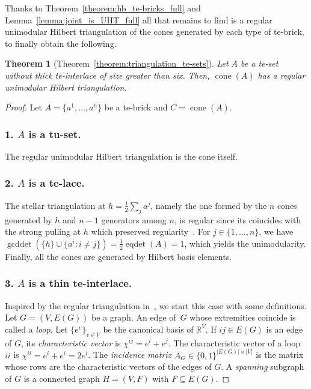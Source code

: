 \documentclass[11pt,a4paper]{amsart}
\theoremstyle{plain}
\newtheorem{theorem}{Theorem}[section]%
\theoremstyle{definition}
\newcommand{\R}{\mathbb{R}}
\DeclareMathOperator{\cone}{cone}
\DeclareMathOperator{\eqdet}{eqdet}
\DeclareMathOperator{\gcddet}{gcddet}
\begin{document}
Thanks to Theorem~\ref{theorem:hb_te-bricks_full} and Lemma~\ref{lemma:joint_is_UHT_full} all that remains to find is a regular unimodular Hilbert triangulation of the cones generated by each type of te-brick, to finally obtain the following.
\begin{theorem}[Theorem~\ref{theorem:triangulation_te-sets}]\label{theorem:triangulation_te-sets_l}
Let $A$ be a te-set without thick te-interlace of size greater than six.
Then, $\cone (A)$ has a regular unimodular Hilbert triangulation.
\end{theorem}
\begin{proof}
Let $A=\{a^1,\dots,a^n\}$ be a te-brick and $C=\cone(A)$.
\subsubsection*{1. $A$ is a tu-set.}
The regular unimodular Hilbert triangulation is the cone itself.

\subsubsection*{2. $A$ is a te-lace.}
The stellar triangulation at $h=\frac{1}{2}\sum_j a^j$, namely the one formed by the $n$ cones generated by $h$ and $n-1$ generators among $n$, is regular since its coincides with the strong pulling at $h$ which preserved regularity~\cite[Lemma~2.1]{Haase_Paffenholz_Piechnik_Santos_2021}.
For $j\in\{1,\dots,n\}$, we have $\gcddet(\{h\}\cup \{a^i: i\neq j\})=\frac{1}{2}\eqdet(A)=1$, which yields the unimodularity.
Finally, all the cones are generated by Hilbert basis elements.

\subsubsection*{3. $A$ is a thin te-interlace.}
Inspired by the regular triangulation in~\cite{DeLoera_Sturmfels_Thomas_1995}, we start this case with some definitions.
Let $G=(V,E(G))$ be a graph.
An edge of~$G$ whose extremities coincide is called a \emph{loop}.
Let $\{e^v\}_{v\in V}$ be the canonical basis of $\R^V$.
If $ij\in E(G)$ is an edge of $G$, its \emph{characteristic vector} is $\chi^{ij}=e^i+e^j$.
The characteristic vector of a loop $ii$ is $\chi^{ii}=e^i+e^i = 2e^i$.
The \emph{incidence matrix} $A_G\in\{0,1\}^{|E(G)|\times |V|}$ is the matrix whose rows are the characteristic vectors of the edges of $G$.
A \emph{spanning} subgraph of $G$ is a connected graph $H=(V,F)$ with $F\subseteq E(G)$.


\end{proof}
\end{document}
